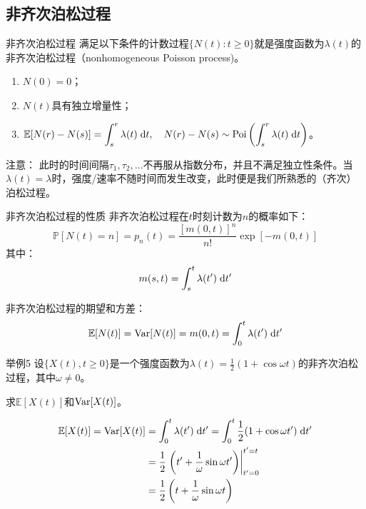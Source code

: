 \documentclass[t]{beamer}
\newcommand{\dif}{{\;\rm d}}
\renewcommand{\Pr}{\mathbb{P}}
\newcommand{\E}{\mathbb{E}}
\newcommand{\Var}{{\rm Var}}
\begin{document}
\subsection{非齐次泊松过程}
\begin{frame}{非齐次泊松过程}
    满足以下条件的计数过程$\{N(t): t\ge0 \}$就是强度函数为$\lambda(t)$的非齐次泊松过程（nonhomogeneous Poisson process)。
	\begin{enumerate}[\quad\;(1)]
		\item $N(0)=0$；
		\item $N(t)$具有独立增量性；
		\item $ 
		\E[N(r)-N(s)]=\displaystyle\int_{s}^{r} \lambda(t) \dif t,\quad  
		N(r)-N(s) \sim \text{Poi}\left(\displaystyle\int_{s}^{r} \lambda(t) \dif t\right)$。
    \end{enumerate}
    
    \begin{block}{注意：}
        此时的时间间隔$\tau_1,\tau_2,\ldots$不再服从指数分布，并且不满足独立性条件。当$\lambda(t)=\lambda$时，强度/速率不随时间而发生改变，此时便是我们所熟悉的（齐次）泊松过程。 
    \end{block}
\end{frame}


\begin{frame}{非齐次泊松过程的性质}
    非齐次泊松过程在$t$时刻计数为$n$的概率如下：
    \[\Pr[N(t)=n]=p_n(t)=\frac{[m(0,t)]^n}{n!}\exp\left[-m(0,t) \right] \]
    其中：\[m(s,t)= \int^t_s \lambda(t')\dif t' \]
  
    非齐次泊松过程的期望和方差：
\begin{equation*}
\E[N(t)]=\Var[N(t)]=m(0,t)= \int^t_0 \lambda(t')\dif t'
\end{equation*}
\end{frame}


\begin{frame}{举例5}
    设$\{X(t), t\ge0\}$是一个强度函数为$\lambda(t)=\displaystyle\frac{1}{2}(1+\cos\omega t)$的非齐次泊松过程，其中$\omega\ne 0$。

求$\E[X(t)]$和$\Var[X(t)]$。

\begin{block}{}
    \[\begin{split}
        \E[X(t)]=\Var[X(t)]&=\int^t_0 \lambda(t') \dif t'=\int^t_0 \frac{1}{2}(1+\cos\omega t')\dif t'\\
        &=\frac{1}{2}\left.\left(t'+\frac{1}{\omega}\sin \omega t'\right)\right|^{t'=t}_{t'=0}\\
        &=\frac{1}{2}\left(t+\frac{1}{\omega}\sin \omega t\right)
        \end{split} \]
\end{block}
\end{frame}
\end{document}
